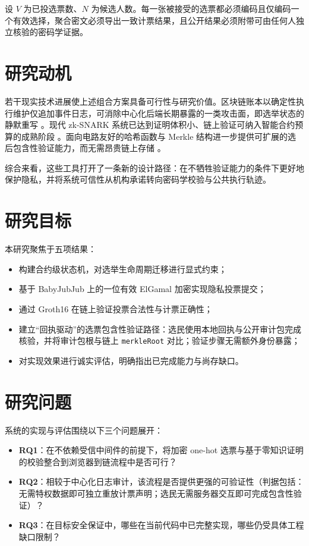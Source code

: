 设 $V$ 为已投选票数、$N$ 为候选人数。每一张被接受的选票都必须编码且仅编码一个有效选择，聚合密文必须导出一致计票结果，且公开结果必须附带可由任何人独立核验的密码学证据。

\section{研究动机}

若干现实技术进展使上述组合方案具备可行性与研究价值。区块链账本以确定性执行维护仅追加事件日志，可消除中心化后端长期暴露的一类攻击面，即选举状态的静默重写 \cite{nakamoto2008,wood2014}。现代 zk-SNARK 系统已达到证明体积小、链上验证可纳入智能合约预算的成熟阶段 \cite{groth2016}。面向电路友好的哈希函数与 Merkle 结构进一步提供可扩展的选后包含性验证能力，而无需昂贵链上存储 \cite{poseidon2019,merkle1988}。

综合来看，这些工具打开了一条新的设计路径：在不牺牲验证能力的条件下更好地保护隐私，并将系统可信性从机构承诺转向密码学校验与公共执行轨迹。

\section{研究目标}

本研究聚焦于五项结果：
\begin{itemize}
    \item 构建合约级状态机，对选举生命周期迁移进行显式约束；
    \item 基于 BabyJubJub 上的一位有效 ElGamal 加密实现隐私投票提交；
    \item 通过 Groth16 在链上验证投票合法性与计票正确性；
    \item 建立“回执驱动”的选票包含性验证路径：选民使用本地回执与公开审计包完成核验，并将审计包根与链上 \texttt{merkleRoot} 对比；验证步骤无需额外身份暴露；
    \item 对实现效果进行诚实评估，明确指出已完成能力与尚存缺口。
\end{itemize}

\section{研究问题}

系统的实现与评估围绕以下三个问题展开：
\begin{itemize}
    \item \textbf{RQ1}：在不依赖受信中间件的前提下，将加密 one-hot 选票与基于零知识证明的校验整合到浏览器到链流程中是否可行？
    \item \textbf{RQ2}：相较于中心化日志审计，该流程是否提供更强的可验证性（判据包括：无需特权数据即可独立重放计票声明；选民无需服务器交互即可完成包含性验证）？
    \item \textbf{RQ3}：在目标安全保证中，哪些在当前代码中已完整实现，哪些仍受具体工程缺口限制？
\end{itemize}

